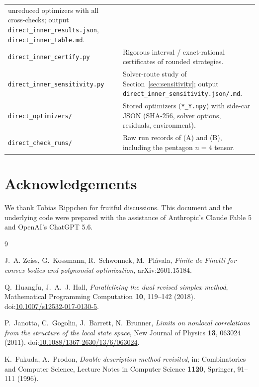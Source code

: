 \documentclass[11pt,a4paper]{article}
\newcommand*{\code}[1]{\texttt{#1}}
\theoremstyle{remark}
\begin{document}
\begin{center}
\begin{tabular}{>{\raggedright\arraybackslash}p{52mm}>{\raggedright\arraybackslash}p{90mm}}
unreduced optimizers with all cross-checks; output
\code{direct\_inner\_results.json}, \code{direct\_inner\_table.md}.\\
\code{direct\_inner\_certify.py} & Rigorous interval /
exact-rational certificates of rounded strategies.\\
\code{direct\_inner\_sensitivity.py} & Solver-route
study of Section~\ref{sec:sensitivity}; output
\code{direct\_inner\_sensitivity.json/.md}.\\
\code{direct\_optimizers/} & Stored optimizers
(\code{*\_Y.npy}) with side-car JSON (SHA-256, solver options, residuals,
environment).\\
\code{direct\_check\_runs/} & Raw run records of (A) and
(B), including the pentagon $n=4$ tensor.\\
\bottomrule
\end{tabular}
\end{center}

\section*{Acknowledgements}
We thank Tobias Rippchen for fruitful discussions. This document and the
underlying code were prepared with the assistance of Anthropic's Claude
Fable 5 and OpenAI's ChatGPT 5.6.

\begin{thebibliography}{9}

J.~A. Zeiss, G.~Kossmann, R.~Schwonnek, M.~Pl\'avala,
\emph{Finite de Finetti for convex bodies and polynomial optimization},
arXiv:2601.15184.

Q.~Huangfu, J.~A.~J. Hall,
\emph{Parallelizing the dual revised simplex method},
Mathematical Programming Computation \textbf{10}, 119--142 (2018).
doi:\href{https://doi.org/10.1007/s12532-017-0130-5}{10.1007/s12532-017-0130-5}.

P.~Janotta, C.~Gogolin, J.~Barrett, N.~Brunner,
\emph{Limits on nonlocal correlations from the structure of the local state space},
New Journal of Physics \textbf{13}, 063024 (2011).
doi:\href{https://doi.org/10.1088/1367-2630/13/6/063024}{10.1088/1367-2630/13/6/063024}.

K.~Fukuda, A.~Prodon,
\emph{Double description method revisited},
in: Combinatorics and Computer Science, Lecture Notes in Computer Science
\textbf{1120}, Springer, 91--111 (1996).

\end{thebibliography}
\end{document}
